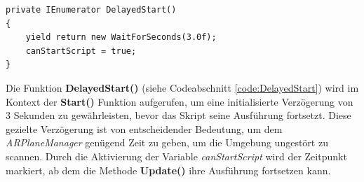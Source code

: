 \begin{lstlisting}[style=csharp, caption={Verzoegerter Start}, label=code:DelayedStart]
private IEnumerator DelayedStart()
{
    yield return new WaitForSeconds(3.0f);
    canStartScript = true;
}
\end{lstlisting}
Die Funktion \textbf{DelayedStart()} (siehe Codeabschnitt \ref{code:DelayedStart}) wird im Kontext der \textbf{Start()}
Funktion aufgerufen, um eine initialisierte Verzögerung von 3 Sekunden zu gewährleisten, bevor das Skript seine Ausführung
fortsetzt. Diese gezielte Verzögerung ist von entscheidender Bedeutung, um dem \textit{ARPlaneManager} genügend Zeit zu
geben, um die Umgebung ungestört zu scannen. Durch die Aktivierung der Variable \textit{canStartScript} wird der Zeitpunkt
markiert, ab dem die Methode \textbf{Update()} ihre Ausführung fortsetzen kann.

